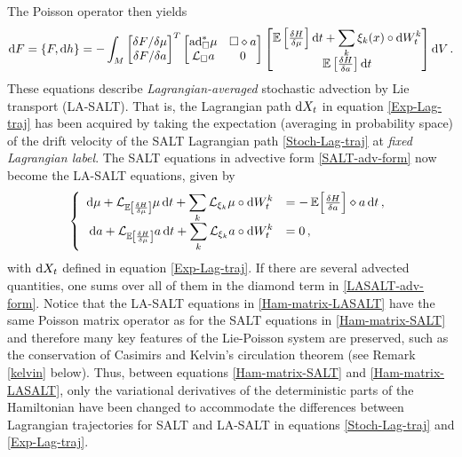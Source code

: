 \documentclass[11pt, oneside]{article}   	%
\numberwithin{equation}{section}
\theoremstyle{plain}
\theoremstyle{definition}
\theoremstyle{remark}
\newcommand{\<}{\langle}
\renewcommand{\>}{\rangle}
\def\diff{\textnormal{d}}
\def\rmd{{\mathrm{d}}}
\newcommand{\E}[1]{\mathbb{E}\left[{#1}\right]}
\begin{document}
The Poisson operator then yields 
\begin{align}
\diff  {F} =\{ F, \diff {h}\}
=
-\int_M 
\begin{bmatrix}
{\delta F}/{\delta \mu} \\  {\delta F}/{ \delta a} 
\end{bmatrix}^T
\begin{bmatrix}
{\rm ad}^*_{\Box}\mu & \Box \diamond a
\\ 
\mathcal{L}_{\Box}a & 0
\end{bmatrix}
\begin{bmatrix}
\mathbb{E}\left[\frac{\delta H }{\delta \mu}\right] \diff t + \displaystyle\sum_k\xi_k(x)\circ \diff W_t^k
\\  \mathbb{E}\left[\frac{\delta H }{\delta a} \right] \diff t 
\end{bmatrix}
{\rmd}V \,.
\label{Ham-matrix-LASALT}
\end{align}
These equations describe \emph{Lagrangian-averaged} stochastic advection by Lie transport (LA-SALT). That is, the Lagrangian path ${\rm d}X_t$ in equation \eqref{Exp-Lag-traj} has been acquired by taking the expectation (averaging in probability space) of the drift velocity of the SALT Lagrangian path \eqref{Stoch-Lag-traj} at \emph{fixed Lagrangian label}.
The SALT equations in advective form \eqref{SALT-adv-form} now become the LA-SALT equations, given by
\begin{equation}\label{LASALT-adv-form}
\left\{
\begin{array}{rl}
{\rm d}{\mu} + \mathcal{L}_{\E{\frac{\delta H }{\delta \mu}}} {\mu} \,\diff t
+ \displaystyle\sum_k \mathcal{L}_{\xi_k} {\mu} \circ \diff W_t^k
&= - \,\mathbb{E}\Big[ \frac{\delta H}{\delta a}\Big] \diamond { a }\,\diff t
\,,\\
 {\rm d} {a} + \mathcal{L}_{\E{\frac{\delta H }{\delta \mu}}} {a} \,\diff t
 + \displaystyle\sum_k \mathcal{L}_{\xi_k} {a} \circ \diff W_t^k  &= 0
\,,
\end{array}
\right.
\end{equation}
with ${\rm d}X_t$ defined in equation \eqref{Exp-Lag-traj}. If there are several advected quantities, one sums over all of them in the diamond term in \eqref{LASALT-adv-form}. Notice that the LA-SALT equations in \eqref{Ham-matrix-LASALT} have the same Poisson matrix operator as for the SALT equations in \eqref{Ham-matrix-SALT} and therefore many key features of the Lie-Poisson system are preserved, such as the conservation of Casimirs and Kelvin's circulation theorem (see Remark \ref{kelvin} below).
Thus, between equations \eqref{Ham-matrix-SALT} and \eqref{Ham-matrix-LASALT}, only the variational derivatives of the deterministic parts of the Hamiltonian have been changed to accommodate the differences between Lagrangian trajectories for SALT and LA-SALT in equations \eqref{Stoch-Lag-traj} and \eqref{Exp-Lag-traj}. 
\end{document}
